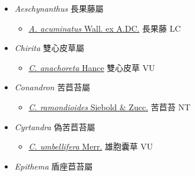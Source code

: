 
  \begin{itemize}
 \item[] \textit{Aeschynanthus} 長果藤屬
                    
  \begin{itemize}
        \item[] \href{http://www.theplantlist.org/tpl1.1/search?q=Aeschynanthus+acuminatus}{\textit{A. acuminatus} Wall. ex A.DC.}   長果藤 LC
  \end{itemize}
 \item[] \textit{Chirita} 雙心皮草屬
                    
  \begin{itemize}
        \item[] \href{http://www.theplantlist.org/tpl1.1/search?q=Chirita+anachoreta}{\textit{C. anachoreta} Hance}   雙心皮草 VU
  \end{itemize}
 \item[] \textit{Conandron} 苦苣苔屬
                    
  \begin{itemize}
        \item[] \href{http://www.theplantlist.org/tpl1.1/search?q=Conandron+ramondioides}{\textit{C. ramondioides} Siebold \& Zucc.}   苦苣苔 NT
  \end{itemize}
 \item[] \textit{Cyrtandra} 偽苦苣苔屬
                    
  \begin{itemize}
        \item[] \href{http://www.theplantlist.org/tpl1.1/search?q=Cyrtandra+umbellifera}{\textit{C. umbellifera} Merr.}   雄胞囊草 VU
  \end{itemize}
 \item[] \textit{Epithema} 盾座苣苔屬
                    

\end{itemize}
